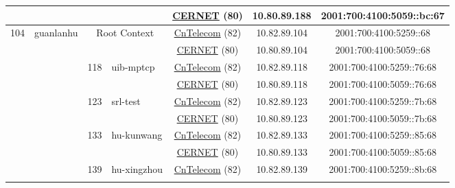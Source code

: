 \begin{small}
\begin{center}
\begin{longtable}{|c|c|c|c|c|c|c|c|}
  &  &  &  & \multicolumn{2}{|c|}{\tiny{\href{http://www.cernet.edu.cn}{CERNET} (80)}} & \tiny{10.80.89.188} & \tiny{2001:700:4100:5059::bc:67} \\ \hline
 \multirow{26}{*}{\tiny{104}} & \multicolumn{1}{|l|}{\multirow{26}{*}{\tiny{guanlanhu}}} & \multicolumn{2}{|c|}{\multirow{2}{*}{\tiny{Root Context}}} & \multicolumn{2}{|c|}{\tiny{\href{http://www.chinatelecom.com.cn}{CnTelecom} (82)}} & \tiny{10.82.89.104} & \tiny{2001:700:4100:5259::68} \\* \cline{5-5}\cline{6-6}\cline{7-7}\cline{8-8}
  &  & \multicolumn{2}{|c|}{} & \multicolumn{2}{|c|}{\tiny{\href{http://www.cernet.edu.cn}{CERNET} (80)}} & \tiny{10.80.89.104} & \tiny{2001:700:4100:5059::68} \\* \cline{3-3}\cline{4-4}\cline{5-5}\cline{6-6}\cline{7-7}\cline{8-8}
  &  & \multirow{2}{*}{\tiny{118}} & \multicolumn{1}{|l|}{\multirow{2}{*}{\tiny{uib-mptcp}}} & \multicolumn{2}{|c|}{\tiny{\href{http://www.chinatelecom.com.cn}{CnTelecom} (82)}} & \tiny{10.82.89.118} & \tiny{2001:700:4100:5259::76:68} \\* \cline{5-5}\cline{6-6}\cline{7-7}\cline{8-8}
  &  &  &  & \multicolumn{2}{|c|}{\tiny{\href{http://www.cernet.edu.cn}{CERNET} (80)}} & \tiny{10.80.89.118} & \tiny{2001:700:4100:5059::76:68} \\* \cline{3-3}\cline{4-4}\cline{5-5}\cline{6-6}\cline{7-7}\cline{8-8}
  &  & \multirow{2}{*}{\tiny{123}} & \multicolumn{1}{|l|}{\multirow{2}{*}{\tiny{srl-test}}} & \multicolumn{2}{|c|}{\tiny{\href{http://www.chinatelecom.com.cn}{CnTelecom} (82)}} & \tiny{10.82.89.123} & \tiny{2001:700:4100:5259::7b:68} \\* \cline{5-5}\cline{6-6}\cline{7-7}\cline{8-8}
  &  &  &  & \multicolumn{2}{|c|}{\tiny{\href{http://www.cernet.edu.cn}{CERNET} (80)}} & \tiny{10.80.89.123} & \tiny{2001:700:4100:5059::7b:68} \\* \cline{3-3}\cline{4-4}\cline{5-5}\cline{6-6}\cline{7-7}\cline{8-8}
  &  & \multirow{2}{*}{\tiny{133}} & \multicolumn{1}{|l|}{\multirow{2}{*}{\tiny{hu-kunwang}}} & \multicolumn{2}{|c|}{\tiny{\href{http://www.chinatelecom.com.cn}{CnTelecom} (82)}} & \tiny{10.82.89.133} & \tiny{2001:700:4100:5259::85:68} \\* \cline{5-5}\cline{6-6}\cline{7-7}\cline{8-8}
  &  &  &  & \multicolumn{2}{|c|}{\tiny{\href{http://www.cernet.edu.cn}{CERNET} (80)}} & \tiny{10.80.89.133} & \tiny{2001:700:4100:5059::85:68} \\* \cline{3-3}\cline{4-4}\cline{5-5}\cline{6-6}\cline{7-7}\cline{8-8}
  &  & \multirow{2}{*}{\tiny{139}} & \multicolumn{1}{|l|}{\multirow{2}{*}{\tiny{hu-xingzhou}}} & \multicolumn{2}{|c|}{\tiny{\href{http://www.chinatelecom.com.cn}{CnTelecom} (82)}} & \tiny{10.82.89.139} & \tiny{2001:700:4100:5259::8b:68} \\* \cline{5-5}\cline{6-6}\cline{7-7}\cline{8-8}

\end{longtable}
\end{center}
\end{small}
